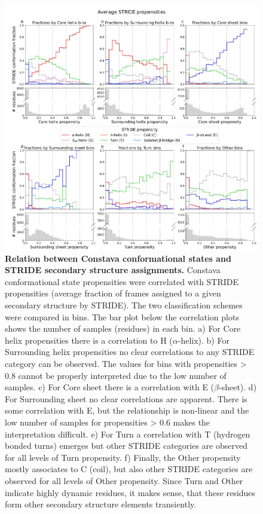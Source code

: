 \begin{figure}[H]
    \centering
    \includegraphics[width=0.9\linewidth]{constava//sup_figs/supfig8.pdf}
    \caption{\textbf{Relation between Constava conformational states and STRIDE secondary structure assignments.} Constava conformational state propensities were correlated with STRIDE propensities (average fraction of frames assigned to a given secondary structure by STRIDE). The two classification schemes were compared in bins. The bar plot below the correlation plots shows the number of samples (residues) in each bin. a) For Core helix propensities there is a correlation to H ($\alpha$-helix). b) For Surrounding helix propensities no clear correlations to any STRIDE category can be observed. The values for bins with propensities > 0.8 cannot be properly interpreted due to the low number of samples. c) For Core sheet there is a correlation with E ($\beta$-sheet). d) For Surrounding sheet no clear correlations are apparent. There is some correlation with E, but the relationship is non-linear and the low number of samples for propensities > 0.6 makes the interpretation difficult. e) For Turn a correlation with T (hydrogen bonded turns) emerges but other STRIDE categories are observed for all levels of Turn propensity. f) Finally, the Other propensity mostly associates to C (coil), but also other STRIDE categories are observed for all levels of Other propensity. Since Turn and Other indicate highly dynamic residues, it makes sense, that these residues form other secondary structure elements transiently.}
    \label{fig:sup_fig_constava:stride_assignments}
\end{figure}


